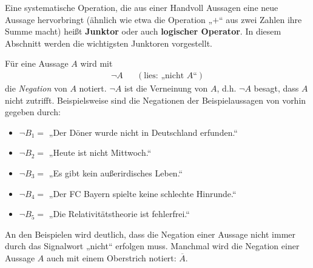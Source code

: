 Eine systematische Operation, die aus einer Handvoll Aussagen eine neue Aussage hervorbringt (ähnlich wie etwa die Operation „$+$“ aus zwei Zahlen ihre Summe macht) heißt \textbf{Junktor} oder auch \textbf{logischer Operator}. In diesem Abschnitt werden die wichtigsten Junktoren vorgestellt.
	\begin{de}[Negation]
		Für eine Aussage $A$ wird mit
    \begin{align*}
   \neg A   && (\text{lies: „nicht $A$“})
    \end{align*}
die \emph{Negation} von $A$ notiert. $\neg A$ ist die Verneinung von $A$, d.h. $\neg A$ besagt, dass $A$ nicht zutrifft. Beispielsweise sind die Negationen der Beispielaussagen von vorhin gegeben durch:
 \begin{itemize}
			\item $\neg B_1 =$ „Der Döner wurde nicht in Deutschland erfunden.“
			\item $\neg B_2 =$ „Heute ist nicht Mittwoch.“
			\item $\neg B_3 =$ „Es gibt kein außerirdisches Leben.“
			\item $\neg B_4 =$ „Der FC Bayern spielte keine schlechte Hinrunde.“
			\item $\neg B_5 =$ „Die Relativitätstheorie ist fehlerfrei.“
    \end{itemize}
    An den Beispielen wird deutlich, dass die Negation einer Aussage nicht immer durch das Signalwort „nicht“ erfolgen muss. Manchmal wird die Negation einer Aussage $A$ auch mit einem Oberstrich notiert: $\overline{A}$.
	\end{de}
	

	
	\begin{comment}
	\begin{bem}[Zeichen mit mehr als einer Bedeutung „überladen“]
In dieser Definition haben wir das Zeichen „$A$“ überladen. Denn einerseits bezeichnet $A$ ja schon die Aussage „Der Döner wurde in Deutschland erfunden“, andererseits beginnt die Definition mit „Für eine Aussage $A$ wird\dots“. Wir haben das Zeichen also zugleich als Konstantensymbol und als Variable verwendet. Solche Überladungen von Zeichen sind häufige Fehlerquellen, sollten soweit es geht vermieden und wirklich nur dann verwendet werden, wenn keine Verwirrung auftreten kann und es unmittelbar klar ist, dass eine Überladung vorliegt.
	\end{bem}
\end{comment}


